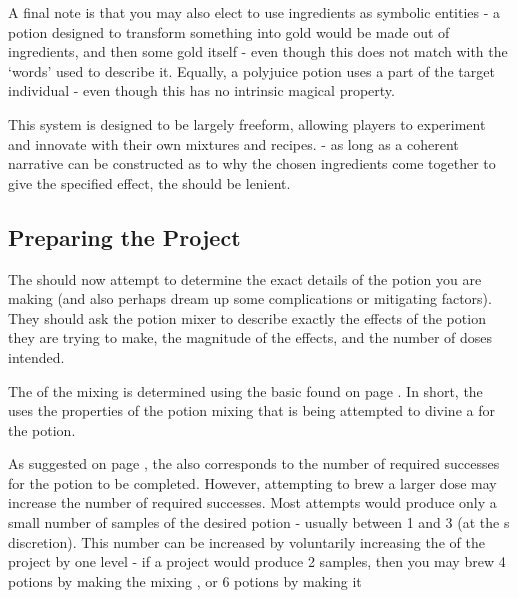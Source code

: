A final note is that you may also elect to use ingredients as symbolic entities - a potion designed to transform something into gold would be made out of  ingredients, and then some gold itself - even though this does not match with the `words' used to describe it. Equally, a polyjuice potion uses a part of the target individual - even though this has no intrinsic magical property. 

This system is designed to be largely freeform, allowing players to experiment and innovate with their own mixtures and recipes. - as long as a coherent narrative can be constructed as to why the chosen ingredients come together to give the specified effect, the  should be lenient.


\subsection{Preparing the Project}

The  should now attempt to determine the exact details of the potion you are making (and also perhaps dream up some complications or mitigating factors). They should ask the potion mixer to describe exactly the effects of the potion they are trying to make, the magnitude of the effects, and the number of doses intended. 

The  of the mixing is determined using the basic  found on page \pageref{T:ArtificingDV}. In short, the  uses the properties of the potion mixing that is being attempted to divine a  for the potion.

As suggested on page \pageref{T:ArtificingDV}, the  also corresponds to the number of required successes for the potion to be completed. However, attempting to brew a larger dose may increase the number of required successes. Most  attempts would produce only a small number of samples of the desired potion - usually between 1 and 3 (at the s discretion). This number can be increased by voluntarily increasing the  of the project by one level - if a  project would produce 2 samples, then you may brew 4 potions by making the mixing , or 6 potions by making it 



